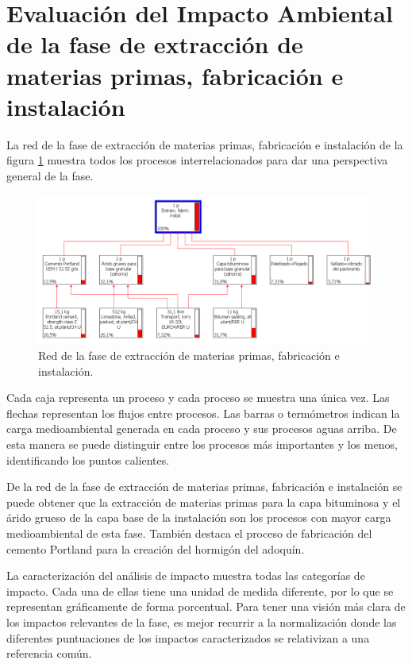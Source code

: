\section{Evaluación del Impacto Ambiental de la fase de extracción de materias primas, fabricación e instalación}

La red de la fase de extracción de materias primas, fabricación e instalación de la figura \ref{fig:fabric_red} muestra todos los procesos interrelacionados para dar una perspectiva general de la fase.

\begin{figure}[!htb]
\centering
\includegraphics[width=14cm]{img/fabric_red.png}
\caption{Red de la fase de extracción de materias primas, fabricación e instalación.}
\label{fig:fabric_red}
\end{figure}

Cada caja representa un proceso y cada proceso se muestra una única vez. Las flechas representan los flujos entre procesos. Las barras o termómetros indican la carga medioambiental generada en cada proceso y sus procesos aguas arriba. De esta manera se puede distinguir entre los procesos más importantes y los menos, identificando los puntos calientes.

De la red de la fase de extracción de materias primas, fabricación e instalación se puede obtener que la extracción de materias primas para la capa bituminosa y el árido grueso de la capa base de la instalación son los procesos con mayor carga medioambiental de esta fase. También destaca el proceso de fabricación del cemento Portland para la creación del hormigón del adoquín.

La caracterización del análisis de impacto muestra todas las categorías de impacto. Cada una de ellas tiene una unidad de medida diferente, por lo que se representan gráficamente de forma porcentual. Para tener una visión más clara de los impactos relevantes de la fase, es mejor recurrir a la normalización donde las diferentes puntuaciones de los impactos caracterizados se relativizan a una referencia común.

